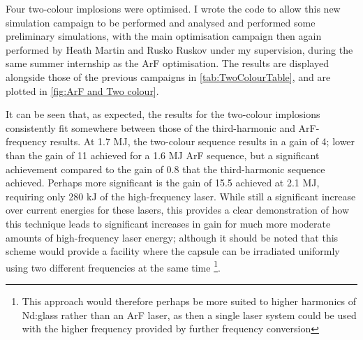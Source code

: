 Four two-colour implosions were optimised. I wrote the code to allow this new simulation campaign to be performed and analysed and performed some preliminary simulations, with the main optimisation campaign then again performed by Heath Martin and Rusko Ruskov under my supervision, during the same summer internship as the ArF optimisation. The results are displayed alongside those of the previous campaigns in \ref{tab:TwoColourTable}, and are plotted in \ref{fig:ArF and Two colour}.

It can be seen that, as expected, the results for the two-colour implosions consistently fit somewhere between those of the third-harmonic and ArF-frequency results. At 1.7 MJ, the two-colour sequence results in a gain of 4; lower than the gain of 11 achieved for a 1.6 MJ ArF sequence, but a significant achievement compared to the gain of 0.8 that the third-harmonic sequence achieved. Perhaps more significant is the gain of 15.5 achieved at 2.1 MJ, requiring only 280 kJ of the high-frequency laser. While still a significant increase over current energies for these lasers, this provides a clear demonstration of how this technique leads to significant increases in gain for much more moderate amounts of high-frequency laser energy; although it should be noted that this scheme would provide a facility where the capsule can be irradiated uniformly using two different frequencies at the same time \footnote{This approach would therefore perhaps be more suited to higher harmonics of Nd:glass rather than an ArF laser, as then a single laser system could be used with the higher frequency provided by further frequency conversion}.

